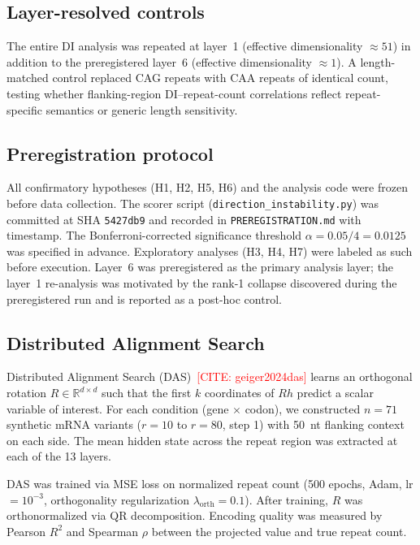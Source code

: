 \documentclass[11pt]{article}
\newcommand{\R}{\mathbb{R}}
\newcommand{\CITE}[1]{\textcolor{red}{[CITE: #1]}}
\begin{document}
\subsection{Layer-resolved controls}

The entire DI analysis was repeated at layer~1 (effective
dimensionality $\approx 51$) in addition to the preregistered
layer~6 (effective dimensionality $\approx 1$). A length-matched
control replaced CAG repeats with CAA repeats of identical count,
testing whether flanking-region DI--repeat-count correlations reflect
repeat-specific semantics or generic length sensitivity.

\subsection{Preregistration protocol}

All confirmatory hypotheses (H1, H2, H5, H6) and the analysis code
were frozen before data collection. The scorer script
(\texttt{direction\_instability.py}) was committed at SHA
\texttt{5427db9} and recorded in \texttt{PREREGISTRATION.md} with
timestamp. The Bonferroni-corrected significance threshold
$\alpha = 0.05 / 4 = 0.0125$ was specified in advance. Exploratory
analyses (H3, H4, H7) were labeled as such before execution.
Layer~6 was preregistered as the primary analysis layer; the layer~1
re-analysis was motivated by the rank-1 collapse discovered during
the preregistered run and is reported as a post-hoc control.


\subsection{Distributed Alignment Search}

Distributed Alignment Search (DAS)~\CITE{geiger2024das} learns an
orthogonal rotation $R \in \R^{d \times d}$ such that the first $k$
coordinates of $Rh$ predict a scalar variable of interest. For each
condition (gene $\times$ codon), we constructed $n = 71$ synthetic mRNA
variants ($r = 10$ to $r = 80$, step 1) with 50~nt flanking context on
each side. The mean hidden state across the repeat region was extracted
at each of the 13 layers.

DAS was trained via MSE loss on normalized repeat count (500 epochs,
Adam, lr $= 10^{-3}$, orthogonality regularization
$\lambda_{\mathrm{orth}} = 0.1$). After training, $R$ was
orthonormalized via QR decomposition. Encoding quality was measured by
Pearson $R^2$ and Spearman $\rho$ between the projected value and
true repeat count.
\end{document}
